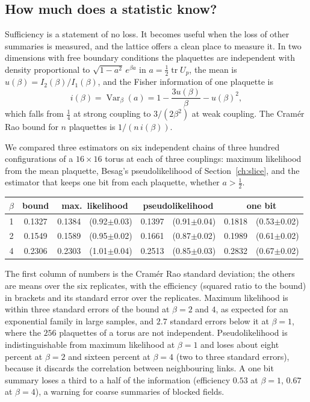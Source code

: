 \subsection{How much does a statistic know?}

Sufficiency is a statement of no loss. It becomes useful when the loss of other summaries is measured, and the lattice offers a clean place to measure it. In two dimensions with free boundary conditions the plaquettes are independent with density proportional to $\sqrt{1-a^2}\,e^{\beta a}$ in $a=\frac12\operatorname{tr}U_p$, the mean is $u(\beta)=I_2(\beta)/I_1(\beta)$, and the Fisher information of one plaquette is
\[
i(\beta)=\operatorname{Var}_\beta(a)=1-\frac{3u(\beta)}{\beta}-u(\beta)^2 ,
\]
which falls from $\frac14$ at strong coupling to $3/(2\beta^2)$ at weak coupling. The Cram\'er Rao bound for $n$ plaquettes is $1/(n\,i(\beta))$.

We compared three estimators on six independent chains of three hundred configurations of a $16\times16$ torus at each of three couplings: maximum likelihood from the mean plaquette, Besag's pseudolikelihood of Section~\ref{ch:slice}, and the estimator that keeps one bit from each plaquette, whether $a>\frac12$.

\begin{center}
\footnotesize
\begin{tabular}{ccccc}
\toprule
$\beta$ & bound & max.\ likelihood & pseudolikelihood & one bit \\ \midrule
1 & 0.1327 & 0.1384\ \ (0.92$\pm$0.03) & 0.1397\ \ (0.91$\pm$0.04) & 0.1818\ \ (0.53$\pm$0.02) \\
2 & 0.1549 & 0.1589\ \ (0.95$\pm$0.02) & 0.1661\ \ (0.87$\pm$0.02) & 0.1989\ \ (0.61$\pm$0.02) \\
4 & 0.2306 & 0.2303\ \ (1.01$\pm$0.04) & 0.2513\ \ (0.85$\pm$0.03) & 0.2832\ \ (0.67$\pm$0.02) \\
\bottomrule
\end{tabular}
\end{center}

The first column of numbers is the Cram\'er Rao standard deviation; the others are means over the six replicates, with the efficiency (squared ratio to the bound) in brackets and its standard error over the replicates. Maximum likelihood is within three standard errors of the bound at $\beta=2$ and $4$, as expected for an exponential family in large samples, and $2.7$ standard errors below it at $\beta=1$, where the $256$ plaquettes of a torus are not independent. Pseudolikelihood is indistinguishable from maximum likelihood at $\beta=1$ and loses about eight percent at $\beta=2$ and sixteen percent at $\beta=4$ (two to three standard errors), because it discards the correlation between neighbouring links. A one bit summary loses a third to a half of the information (efficiency $0.53$ at $\beta=1$, $0.67$ at $\beta=4$), a warning for coarse summaries of blocked fields.

